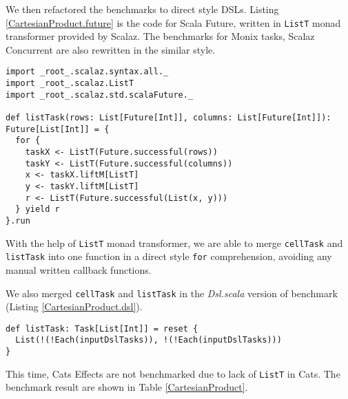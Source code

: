 We then refactored the benchmarks to direct style DSLs. Listing \ref{CartesianProduct.future} is the code for Scala Future, written in \lstinline{ListT} monad transformer provided by Scalaz. The benchmarks for Monix tasks, Scalaz Concurrent are also rewritten in the similar style.

\begin{lstlisting}[caption={Cartesian product for Scala Future, based on \lstinline{ListT} transformer},label={CartesianProduct.future}]
import _root_.scalaz.syntax.all._
import _root_.scalaz.ListT
import _root_.scalaz.std.scalaFuture._

def listTask(rows: List[Future[Int]], columns: List[Future[Int]]): Future[List[Int]] = {
  for {
    taskX <- ListT(Future.successful(rows))
    taskY <- ListT(Future.successful(columns))
    x <- taskX.liftM[ListT]
    y <- taskY.liftM[ListT]
    r <- ListT(Future.successful(List(x, y)))
  } yield r
}.run
\end{lstlisting}

With the help of \lstinline{ListT} monad transformer, we are able to merge \lstinline{cellTask} and \lstinline{listTask} into one function in a direct style \lstinline{for} comprehension, avoiding any manual written callback functions.

We also merged \lstinline{cellTask} and \lstinline{listTask} in the \textit{Dsl.scala} version of benchmark (Listing \ref{CartesianProduct.dsl}).

\begin{lstlisting}[caption={Cartesian product for vanilla CPS functions, in one function},label={CartesianProduct.dsl}]
def listTask: Task[List[Int]] = reset {
  List(!(!Each(inputDslTasks)), !(!Each(inputDslTasks)))
}
\end{lstlisting}

This time, Cats Effects are not benchmarked due to lack of \lstinline{ListT} in Cats. The benchmark result are shown in Table \ref{CartesianProduct}.

